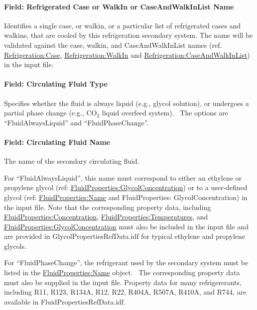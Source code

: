 \paragraph{Field: Refrigerated Case or WalkIn or CaseAndWalkInList Name}\label{field-refrigerated-case-or-walkin-or-caseandwalkinlist-name-1}

Identifies a single case, or walkin, or a particular list of refrigerated cases and walkins, that are cooled by this refrigeration secondary system. The name will be validated against the case, walkin, and CaseAndWalkInList names (ref. \hyperref[refrigerationcase]{Refrigeration:Case}, \hyperref[refrigerationwalkin]{Refrigeration:WalkIn} and \hyperref[refrigerationcaseandwalkinlist]{Refrigeration:CaseAndWalkInList}) in the input file.

\paragraph{Field: Circulating Fluid Type}\label{field-circulating-fluid-type}

Specifies whether the fluid is always liquid (e.g., glycol solution), or undergoes a partial phase change (e.g., CO\(_{2}\) liquid overfeed system).~ The options are ``FluidAlwaysLiquid'' and ``FluidPhaseChange''.

\paragraph{Field: Circulating Fluid Name}\label{field-circulating-fluid-name}

The name of the secondary circulating fluid.

For ``FluidAlwaysLiquid'', this name must correspond to either an ethylene or propylene glycol (ref: \hyperref[fluidpropertiesglycolconcentration]{FluidProperties:GlycolConcentration}) or to a user-defined glycol (ref: \hyperref[fluidpropertiesname]{FluidProperties:Name} and FluidProperties: GlycolConcentration) in the input file. Note that the corresponding property data, including \hyperref[fluidpropertiesconcentration]{FluidProperties:Concentration}, \hyperref[fluidpropertiestemperatures]{FluidProperties:Temperatures}, and \hyperref[fluidpropertiesglycolconcentration]{FluidProperties:GlycolConcentration} must also be included in the input file and are provided in GlycolPropertiesRefData.idf for typical ethylene and propylene glycols.

For ``FluidPhaseChange'', the refrigerant used by the secondary system must be listed in the \hyperref[fluidpropertiesname]{FluidProperties:Name} object.~ The corresponding property data must also be supplied in the input file. Property data for many refrigererants, including R11, R123, R134A, R12, R22, R404A, R507A, R410A, and R744, are available in FluidPropertiesRefData.idf.

